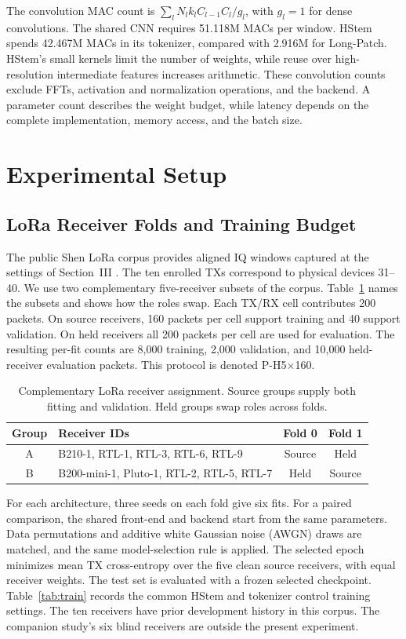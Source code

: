 \documentclass[journal]{IEEEtran}
\begin{document}
The convolution MAC count is \(\sum_l N_l k_l C_{l-1} C_l/g_l\), with \(g_l=1\) for dense convolutions. The shared CNN requires 51.118M MACs per window. HStem spends 42.467M MACs in its tokenizer, compared with 2.916M for Long-Patch. HStem's small kernels limit the number of weights, while reuse over high-resolution intermediate features increases arithmetic. These convolution counts exclude FFTs, activation and normalization operations, and the backend. A parameter count describes the weight budget, while latency depends on the complete implementation, memory access, and the batch size.

\section{Experimental Setup}
\subsection{LoRa Receiver Folds and Training Budget}
The public Shen LoRa corpus provides aligned IQ windows captured at the settings of Section~III \cite{shen2024receiver}. The ten enrolled TXs correspond to physical devices 31--40. We use two complementary five-receiver subsets of the corpus. Table~\ref{tab:folds} names the subsets and shows how the roles swap. Each TX/RX cell contributes 200 packets. On source receivers, 160 packets per cell support training and 40 support validation. On held receivers all 200 packets per cell are used for evaluation. The resulting per-fit counts are 8,000 training, 2,000 validation, and 10,000 held-receiver evaluation packets. This protocol is denoted P-H5\(\times\)160.

\begin{table}[!t]\centering
\caption{Complementary LoRa receiver assignment. Source groups supply both fitting and validation. Held groups swap roles across folds.}
\label{tab:folds}
\begin{tabularx}{\columnwidth}{@{}cXcc@{}}\toprule
Group & Receiver IDs & Fold 0 & Fold 1\\\midrule
A & B210-1, RTL-1, RTL-3, RTL-6, RTL-9 & Source & Held\\
B & B200-mini-1, Pluto-1, RTL-2, RTL-5, RTL-7 & Held & Source\\\bottomrule
\end{tabularx}
\end{table}

For each architecture, three seeds on each fold give six fits. For a paired comparison, the shared front-end and backend start from the same parameters. Data permutations and additive white Gaussian noise (AWGN) draws are matched, and the same model-selection rule is applied. The selected epoch minimizes mean TX cross-entropy over the five clean source receivers, with equal receiver weights. The test set is evaluated with a frozen selected checkpoint. Table~\ref{tab:train} records the common HStem and tokenizer control training settings. The ten receivers have prior development history in this corpus. The companion study's six blind receivers are outside the present experiment.
\end{document}
